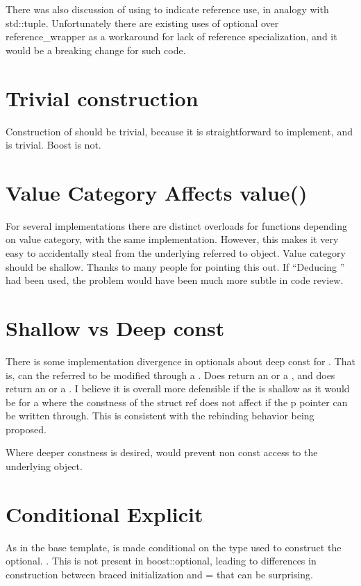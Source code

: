 \documentclass[a4paper,10pt,oneside,openany,final,article]{memoir}
\begin{document}
There was also discussion of using  to indicate reference use, in analogy with std::tuple. Unfortunately there are existing uses of optional over reference_wrapper as a workaround for lack of reference specialization, and it would be a breaking change for such code.

\section{Trivial construction}
Construction of  should be trivial, because it is straightforward to implement, and  is trivial. Boost is not.

\section{Value Category Affects value()}
For several implementations there are distinct overloads for functions depending on value category, with the same implementation. However, this makes it very easy to accidentally steal from the underlying referred to object. Value category should be shallow. Thanks to many people for pointing this out. If ``Deducing '' had been used, the problem would have been much more subtle in code review.

\section{Shallow vs Deep const}

There is some implementation divergence in optionals about deep const for . That is, can the referred to  be modified through a . Does  return an  or a , and does  return an  or a . I believe it is overall more defensible if the  is shallow as it would be for a  where the constness of the struct ref does not affect if the p pointer can be written through. This is consistent with the rebinding behavior being proposed.

Where deeper constness is desired,  would prevent non const access to the underlying object.

\section{Conditional Explicit}
As in the base template,  is made conditional on the type used to construct the optional. . This is not present in boost::optional, leading to differences in construction between braced initialization and = that can be surprising.
\end{document}
